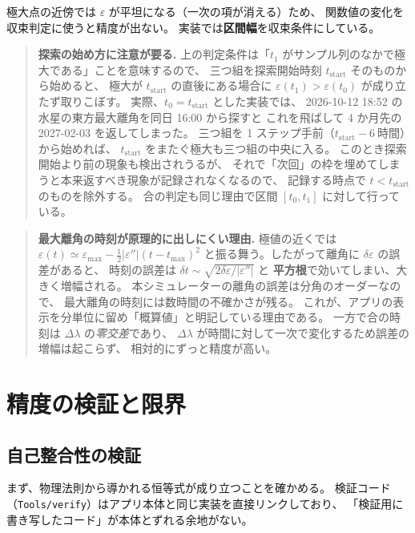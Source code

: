\documentclass[a4paper,11pt]{ltjsarticle}
\begin{document}
極大点の近傍では $\varepsilon$ が平坦になる（一次の項が消える）ため、
関数値の変化を収束判定に使うと精度が出ない。
実装では\textbf{区間幅}を収束条件にしている。

\begin{quote}\small
\textbf{探索の始め方に注意が要る.}
上の判定条件は「$t_1$ がサンプル列のなかで極大である」ことを意味するので、
三つ組を探索開始時刻 $t_{\text{start}}$ そのものから始めると、
極大が $t_{\text{start}}$ の直後にある場合に
$\varepsilon(t_1) > \varepsilon(t_0)$ が成り立たず取りこぼす。
実際、$t_0 = t_{\text{start}}$ とした実装では、
2026-10-12 18:52 の水星の東方最大離角を同日 16:00 から探すと
これを飛ばして 4 か月先の 2027-02-03 を返してしまった。
三つ組を 1 ステップ手前（$t_{\text{start}} - 6\ \text{時間}$）から始めれば、
$t_{\text{start}}$ をまたぐ極大も三つ組の中央に入る。
このとき探索開始より前の現象も検出されうるが、
それで「次回」の枠を埋めてしまうと本来返すべき現象が記録されなくなるので、
記録する時点で $t < t_{\text{start}}$ のものを除外する。
合の判定も同じ理由で区間 $[t_0, t_1]$ に対して行っている。
\end{quote}

\begin{quote}\small
\textbf{最大離角の時刻が原理的に出しにくい理由.}
極値の近くでは $\varepsilon(t) \simeq \varepsilon_{\max} - \tfrac{1}{2}|\varepsilon''|(t-t_{\max})^2$
と振る舞う。したがって離角に $\delta\varepsilon$ の誤差があると、
時刻の誤差は $\delta t \sim \sqrt{2\delta\varepsilon/|\varepsilon''|}$ と
\textbf{平方根}で効いてしまい、大きく増幅される。
本シミュレーターの離角の誤差は分角のオーダーなので、
最大離角の時刻には数時間の不確かさが残る。
これが、アプリの表示を分単位に留め「概算値」と明記している理由である。
一方で合の時刻は $\Delta\lambda$ の\emph{零交差}であり、
$\Delta\lambda$ が時間に対して一次で変化するため誤差の増幅は起こらず、
相対的にずっと精度が高い。
\end{quote}

\section{精度の検証と限界}
\label{sec:accuracy}

\subsection{自己整合性の検証}

まず、物理法則から導かれる恒等式が成り立つことを確かめる。
検証コード（\texttt{Tools/verify}）はアプリ本体と同じ実装を直接リンクしており、
「検証用に書き写したコード」が本体とずれる余地がない。
\end{document}

